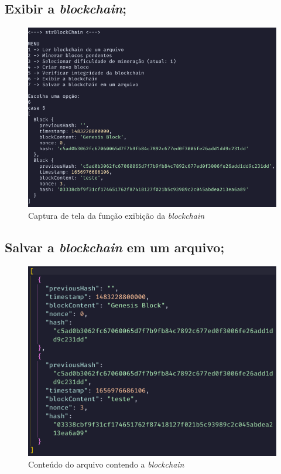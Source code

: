 \documentclass{article}
\begin{document}
\subsection{Exibir a \textit{blockchain};}
\begin{figure}[h!]
  \includegraphics[width=\textwidth]{showChain.png}
  \caption{Captura de tela da função exibição da \textit{blockchain}}
\end{figure}

\subsection{Salvar a \textit{blockchain} em um arquivo;}
\begin{figure}[h!]
  \includegraphics[width=\textwidth]{outputFile.png}
  \caption{Conteúdo do arquivo contendo a \textit{blockchain}}
\end{figure}
\end{document}
